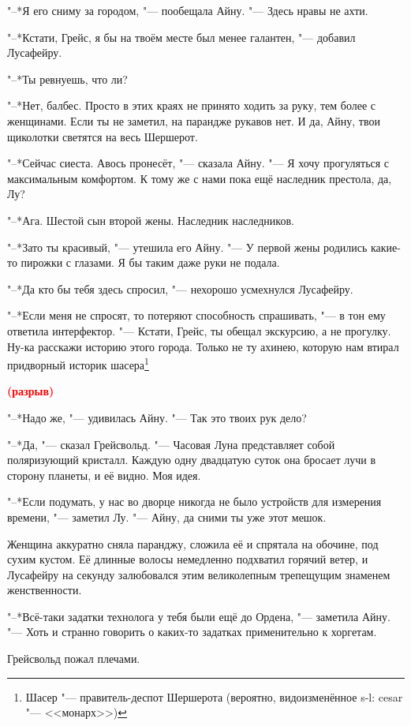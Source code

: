 \documentclass[a4paper,10pt]{book}
\newcommand{\ldotst}{\so{...}\xspace}
\newcommand{\spacing}{\textcolor{red}{\textbf{(разрыв)}}}
\begin{document}
"--*Я его сниму за городом, "--- пообещала Айну. "--- Здесь нравы не ахти.

"--*Кстати, Грейс, я бы на твоём месте был менее галантен, "--- добавил 
Лусафейру.

"--*Ты ревнуешь, что ли?

"--*Нет, балбес. Просто в этих краях не принято ходить за руку, тем более с 
женщинами. Если ты не заметил, на парандже рукавов нет. И да, Айну, твои 
щиколотки светятся на весь Шершерот.

"--*Сейчас сиеста. Авось пронесёт, "--- сказала Айну. "--- Я хочу прогуляться с 
максимальным комфортом. К тому же с нами пока ещё наследник престола, да, Лу?

"--*Ага. Шестой сын второй жены. Наследник наследников.

"--*Зато ты красивый, "--- утешила его Айну. "--- У первой жены родились 
какие-то пирожки с глазами. Я бы таким даже руки не подала.

"--*Да кто бы тебя здесь спросил, "--- нехорошо усмехнулся Лусафейру.

"--*Если меня не спросят, то потеряют способность спрашивать, "--- в тон ему 
ответила интерфектор. "--- Кстати, Грейс, ты обещал экскурсию, а не прогулку. 
Ну-ка расскажи историю этого города. Только не ту ахинею, которую нам втирал 
придворный историк шасера\footnote{Шасер "--- правитель-деспот Шершерота 
(вероятно, видоизменённое s-l: cesar "--- <<монарх>>)}\ldotst

\spacing

"--*Надо же, "--- удивилась Айну. "--- Так это твоих рук дело?

"--*Да, "--- сказал Грейсвольд. "--- Часовая Луна представляет собой 
поляризующий кристалл. Каждую одну двадцатую суток она бросает лучи в сторону 
планеты, и её видно. Моя идея.

"--*Если подумать, у нас во дворце никогда не было устройств для измерения 
времени, "--- заметил Лу. "--- Айну, да сними ты уже этот мешок.

Женщина аккуратно сняла паранджу, сложила её и спрятала на обочине, под сухим 
кустом. Её длинные волосы немедленно подхватил горячий ветер, и Лусафейру на 
секунду залюбовался этим великолепным трепещущим знаменем женственности.

"--*Всё-таки задатки технолога у тебя были ещё до Ордена, "--- заметила Айну. 
"--- Хоть и странно говорить о каких-то задатках применительно к хоргетам.

Грейсвольд пожал плечами.
\end{document}
